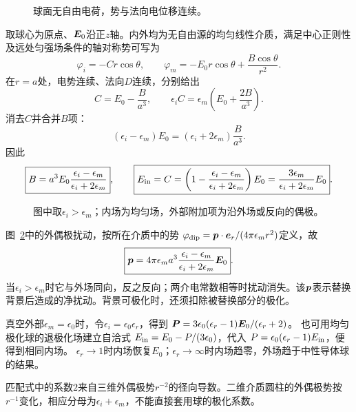 \begin{figure}[H]\centering
{}
\caption{球面无自由电荷，势与法向电位移连续。}\label{fig:es4-e3-q}
\end{figure}
\begin{solution}
取球心为原点、$\bm{E}_0$沿正$z$轴。内外均为无自由源的均匀线性介质，满足中心正则性及远处匀强场条件的轴对称势可写为
\[
 \varphi_i=-Cr\cos\theta,\qquad
 \varphi_m=-E_0r\cos\theta+\frac{B\cos\theta}{r^2}.
\]
在$r=a$处，电势连续、法向$D$连续，分别给出
\[
 C=E_0-\frac B{a^3},\qquad
 \epsilon_iC=\epsilon_m\left(E_0+\frac{2B}{a^3}\right).
\]
消去$C$并合并$B$项：
\[
 (\epsilon_i-\epsilon_m)E_0
 =(\epsilon_i+2\epsilon_m)\frac B{a^3}.
\]
因此
\[
 \boxed{B=a^3E_0\frac{\epsilon_i-\epsilon_m}{\epsilon_i+2\epsilon_m}},
 \qquad
 \boxed{E_{\rm in}=C=
 \left(1-\frac{\epsilon_i-\epsilon_m}{\epsilon_i+2\epsilon_m}\right)E_0
 =\frac{3\epsilon_m}{\epsilon_i+2\epsilon_m}E_0}.
\]
\begin{figure}[H]\centering
{}
\caption{图中取$\epsilon_i>\epsilon_m$；内场为均匀场，外部附加项为沿外场或反向的偶极。}\label{fig:es4-e3-s}
\end{figure}
图~\ref{fig:es4-e3-s}中的外偶极扰动，按所在介质中的势
$\varphi_{\rm dip}=\bm{p}\cdot\bm{e}_r/(4\pi\epsilon_mr^2)$定义，故
\[
 \boxed{\bm{p}=4\pi\epsilon_ma^3
 \frac{\epsilon_i-\epsilon_m}{\epsilon_i+2\epsilon_m}\bm{E}_0}.
\]
当$\epsilon_i>\epsilon_m$时它与外场同向，反之反向；两介电常数相等时扰动消失。该$\bm{p}$表示替换背景后造成的净扰动。背景可极化时，还须扣除被替换部分的极化。

真空外部$\epsilon_m=\epsilon_0$时，令$\epsilon_i=\epsilon_0\epsilon_r$，得到
$\bm{P}=3\epsilon_0(\epsilon_r-1)\bm{E}_0/(\epsilon_r+2)$。
也可用均匀极化球的退极化场建立自洽式
$E_{\rm in}=E_0-P/(3\epsilon_0)$，代入
$P=\epsilon_0(\epsilon_r-1)E_{\rm in}$，便得到相同内场。
$\epsilon_r\to1$时内场恢复$E_0$；$\epsilon_r\to\infty$时内场趋零，外场趋于中性导体球的结果。

匹配式中的系数$2$来自三维外偶极势$r^{-2}$的径向导数。二维介质圆柱的外偶极势按$r^{-1}$变化，相应分母为$\epsilon_i+\epsilon_m$，不能直接套用球的极化系数。
\end{solution}

